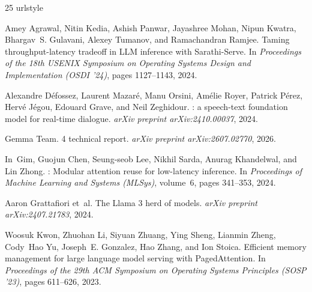 \documentclass{article}
\begin{document}
\begin{thebibliography}{25}
\providecommand{\natexlab}[1]{#1}
\providecommand{\url}[1]{\texttt{#1}}
\expandafter\ifx\csname urlstyle\endcsname\relax
  \providecommand{\doi}[1]{doi: #1}\else
  \providecommand{\doi}{doi: \begingroup \urlstyle{rm}\Url}\fi

Amey Agrawal, Nitin Kedia, Ashish Panwar, Jayashree Mohan, Nipun Kwatra, Bhargav~S. Gulavani, Alexey Tumanov, and Ramachandran Ramjee.
\newblock Taming throughput-latency tradeoff in {LLM} inference with {Sarathi-Serve}.
\newblock In \emph{Proceedings of the 18th USENIX Symposium on Operating Systems Design and Implementation (OSDI '24)}, pages 1127--1143, 2024.

Alexandre D{\'e}fossez, Laurent Mazar{\'e}, Manu Orsini, Am{\'e}lie Royer, Patrick P{\'e}rez, Herv{\'e} J{\'e}gou, Edouard Grave, and Neil Zeghidour.
: a speech-text foundation model for real-time dialogue.
\newblock \emph{arXiv preprint arXiv:2410.00037}, 2024.

{Gemma Team}.
 4 technical report.
\newblock \emph{arXiv preprint arXiv:2607.02770}, 2026.

In~Gim, Guojun Chen, Seung-seob Lee, Nikhil Sarda, Anurag Khandelwal, and Lin Zhong.
: Modular attention reuse for low-latency inference.
\newblock In \emph{Proceedings of Machine Learning and Systems (MLSys)}, volume~6, pages 341--353, 2024.

Aaron Grattafiori et~al.
\newblock The {Llama} 3 herd of models.
\newblock \emph{arXiv preprint arXiv:2407.21783}, 2024.

Woosuk Kwon, Zhuohan Li, Siyuan Zhuang, Ying Sheng, Lianmin Zheng, Cody~Hao Yu, Joseph~E. Gonzalez, Hao Zhang, and Ion Stoica.
\newblock Efficient memory management for large language model serving with {PagedAttention}.
\newblock In \emph{Proceedings of the 29th ACM Symposium on Operating Systems Principles (SOSP '23)}, pages 611--626, 2023.


\end{thebibliography}
\end{document}
